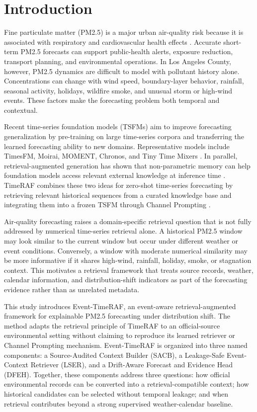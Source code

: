 \section{Introduction}

Fine particulate matter (PM2.5) is a major urban air-quality risk because it is
associated with respiratory and cardiovascular health effects
\cite{who2021airquality}. Accurate short-term PM2.5 forecasts can support
public-health alerts, exposure reduction, transport planning, and environmental
operations. In Los Angeles County, however, PM2.5 dynamics are difficult to
model with pollutant history alone. Concentrations can change with wind speed,
boundary-layer behavior, rainfall, seasonal activity, holidays, wildfire smoke,
and unusual storm or high-wind events. These factors make the forecasting problem
both temporal and contextual.

Recent time-series foundation models (TSFMs) aim to improve forecasting
generalization by pre-training on large time-series corpora and transferring the
learned forecasting ability to new domains. Representative models include
TimesFM, Moirai, MOMENT, Chronos, and Tiny Time Mixers
\cite{das2024timesfm,woo2024moirai,goswami2024moment,ansari2024chronos,ekambaram2024ttm}.
In parallel, retrieval-augmented generation has shown that non-parametric memory
can help foundation models access relevant external knowledge at inference time
\cite{lewis2020rag,karpukhin2020dpr}. TimeRAF combines these two ideas for
zero-shot time-series forecasting by retrieving relevant historical sequences
from a curated knowledge base and integrating them into a frozen TSFM through
Channel Prompting \cite{zhang2025timeraf}.

Air-quality forecasting raises a domain-specific retrieval question that is not
fully addressed by numerical time-series retrieval alone. A historical PM2.5
window may look similar to the current window but occur under different weather
or event conditions. Conversely, a window with moderate numerical similarity may
be more informative if it shares high-wind, rainfall, holiday, smoke, or
stagnation context. This motivates a retrieval framework that treats source
records, weather, calendar information, and distribution-shift indicators as
part of the forecasting evidence rather than as unrelated metadata.

This study introduces Event-TimeRAF, an event-aware retrieval-augmented
framework for explainable PM2.5 forecasting under distribution shift. The
method adapts the retrieval principle of TimeRAF to an official-source
environmental setting without claiming to reproduce its learned retriever or
Channel Prompting mechanism. Event-TimeRAF is organized into three named
components: a Source-Audited Context Builder (SACB), a Leakage-Safe
Event-Context Retriever (LSER), and a Drift-Aware Forecast and Evidence Head
(DFEH). Together, these components address three questions: how official
environmental records can be converted into a retrieval-compatible context;
how historical candidates can be selected without temporal leakage; and when
retrieval contributes beyond a strong supervised weather-calendar baseline.


